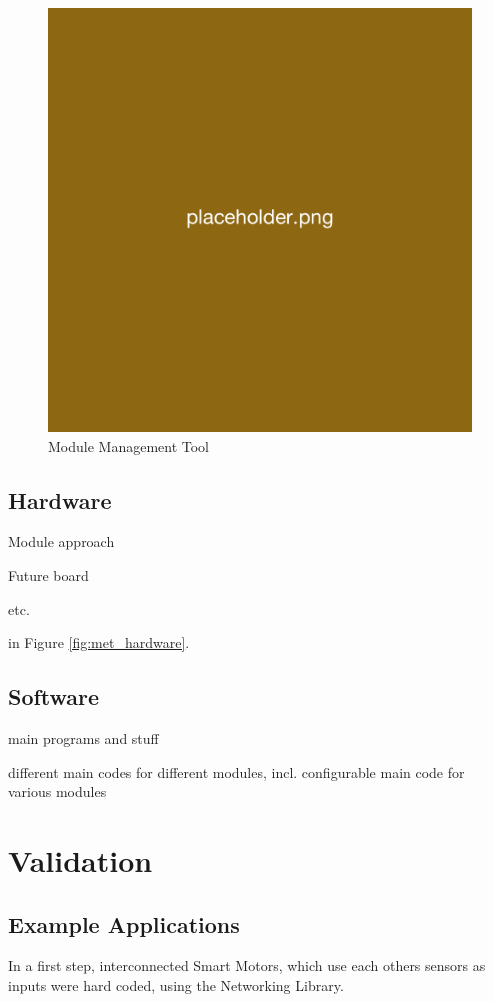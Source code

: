\begin{figure}[H]
    \centering
    \includegraphics[width=0.5\linewidth]{overleaf/images/placeholder.png}
    \vspace{\ftspace}
    \caption{Module Management Tool}
    \vspace{\ftspace}
    \label{fig:mmt}
\end{figure}

\subsection{\label{sec:res_hardware}Hardware}

Module approach

Future board

etc.

in Figure \ref{fig:met_hardware}.

\subsection{\label{sec:res_software}Software}

main programs and stuff

different main codes for different modules, incl. configurable main code for various modules 


\section{\label{sec:res_validation}Validation}

\subsection{\label{sec:res_examplekit}Example Applications}

In a first step, interconnected Smart Motors, which use each others sensors as inputs were hard coded, using the Networking Library. 

